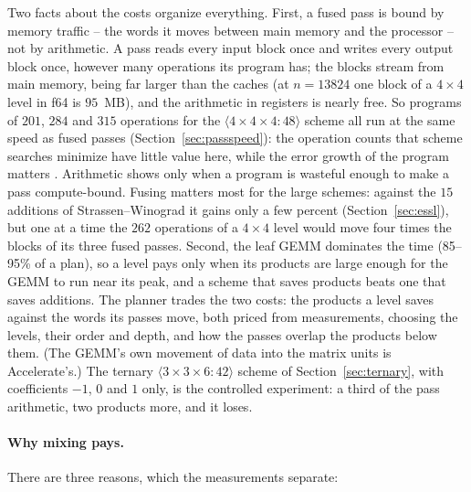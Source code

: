 \documentclass[11pt]{article}
\newcommand{\mm}[1]{\langle #1\rangle}
\begin{document}
Two facts about the costs organize everything.  First, a fused pass is bound
by memory traffic -- the words it moves between main memory and the
processor -- not by arithmetic.  A pass reads every input block once and
writes every output block once, however many operations its program has;
the blocks stream from main memory, being far
larger than the caches (at $n=13824$ one block of a $4\times4$ level in f64
is $95$~MB), and the arithmetic in registers is nearly free.  So programs of
$201$, $284$ and $315$ operations for the $\mm{4\times4\times4:48}$ scheme
all run at the same speed as fused passes (Section~\ref{sec:passspeed}): the
operation counts that scheme searches minimize have little value here, while
the error growth of the program matters \cite{S26b}.  Arithmetic shows only when a program is wasteful enough to make a pass compute-bound.  Fusing matters most for the large schemes: against the $15$ additions of Strassen--Winograd it gains only a few percent (Section~\ref{sec:essl}), but one at a time the $262$ operations of a $4\times4$ level would move four times the blocks of its three fused passes.  Second, the leaf GEMM dominates
the time (85--95\% of a plan), so a level pays only when its products are
large enough for the GEMM to run near its peak, and a scheme that saves
products beats one that saves additions.  The planner trades the two costs:
the products a level saves against the words its passes move, both priced
from measurements, choosing the levels, their order and depth, and how the
passes overlap the products below them.  (The GEMM's own movement of data
into the matrix units is Accelerate's.)  The ternary $\mm{3\times3\times6:42}$ scheme of Section~\ref{sec:ternary},
with coefficients $-1$, $0$ and $1$ only, is the controlled experiment: a third of
the pass arithmetic, two products more, and it loses.

\paragraph{Why mixing pays.}
There are three reasons, which the measurements separate:
\end{document}
